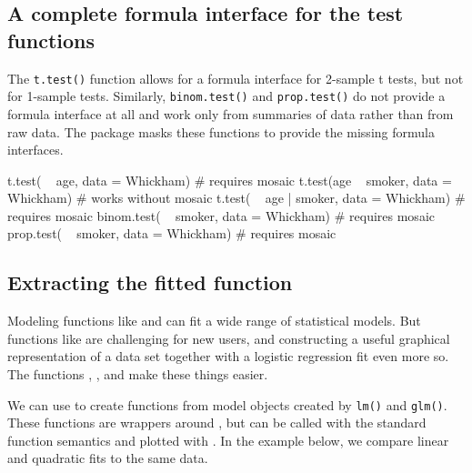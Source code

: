 \subsection{A complete formula interface for the test
functions}\label{a-complete-formula-interface-for-the-test-functions}

The \texttt{t.test()} function allows for a formula interface for
2-sample t tests, but not for 1-sample tests. Similarly,
\texttt{binom.test()} and \texttt{prop.test()} do not provide a formula
interface at all and work only from summaries of data rather than from
raw data. The  package masks these functions to provide the
missing formula interfaces.

\begin{Schunk}
\begin{Sinput}
t.test( ~ age, data = Whickham)           # requires mosaic
t.test(age ~ smoker, data = Whickham)     # works without mosaic
t.test( ~ age | smoker, data = Whickham)  # requires mosaic
binom.test( ~ smoker, data = Whickham)    # requires mosaic
prop.test( ~ smoker, data = Whickham)     # requires mosaic
\end{Sinput}
\end{Schunk}

\subsection{Extracting the fitted
function}\label{extracting-the-fitted-function}

Modeling functions like  and  can fit a wide
range of statistical models. But functions like  are
challenging for new users, and constructing a useful graphical
representation of a data set together with a logistic regression fit
even more so. The  functions ,
, and  make these things easier.

We can use  to create functions from model objects
created by \texttt{lm()} and \texttt{glm()}. These functions are
wrappers around , but can be called with the standard
function semantics and plotted with . In the example
below, we compare linear and quadratic fits to the same data.

